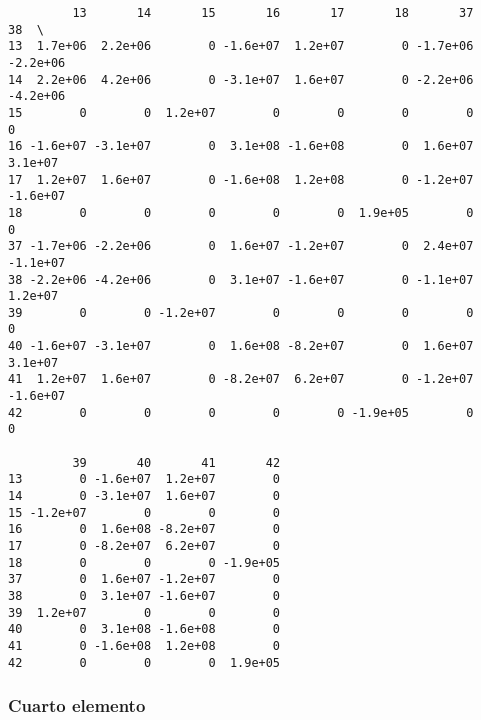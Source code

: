 \documentclass{article}
\begin{document}
    
    \begin{verbatim}
         13       14       15       16       17       18       37       38  \
13  1.7e+06  2.2e+06        0 -1.6e+07  1.2e+07        0 -1.7e+06 -2.2e+06   
14  2.2e+06  4.2e+06        0 -3.1e+07  1.6e+07        0 -2.2e+06 -4.2e+06   
15        0        0  1.2e+07        0        0        0        0        0   
16 -1.6e+07 -3.1e+07        0  3.1e+08 -1.6e+08        0  1.6e+07  3.1e+07   
17  1.2e+07  1.6e+07        0 -1.6e+08  1.2e+08        0 -1.2e+07 -1.6e+07   
18        0        0        0        0        0  1.9e+05        0        0   
37 -1.7e+06 -2.2e+06        0  1.6e+07 -1.2e+07        0  2.4e+07 -1.1e+07   
38 -2.2e+06 -4.2e+06        0  3.1e+07 -1.6e+07        0 -1.1e+07  1.2e+07   
39        0        0 -1.2e+07        0        0        0        0        0   
40 -1.6e+07 -3.1e+07        0  1.6e+08 -8.2e+07        0  1.6e+07  3.1e+07   
41  1.2e+07  1.6e+07        0 -8.2e+07  6.2e+07        0 -1.2e+07 -1.6e+07   
42        0        0        0        0        0 -1.9e+05        0        0   

         39       40       41       42  
13        0 -1.6e+07  1.2e+07        0  
14        0 -3.1e+07  1.6e+07        0  
15 -1.2e+07        0        0        0  
16        0  1.6e+08 -8.2e+07        0  
17        0 -8.2e+07  6.2e+07        0  
18        0        0        0 -1.9e+05  
37        0  1.6e+07 -1.2e+07        0  
38        0  3.1e+07 -1.6e+07        0  
39  1.2e+07        0        0        0  
40        0  3.1e+08 -1.6e+08        0  
41        0 -1.6e+08  1.2e+08        0  
42        0        0        0  1.9e+05  
    \end{verbatim}

    
    \subsubsection{Cuarto elemento}\label{cuarto-elemento}
\end{document}
